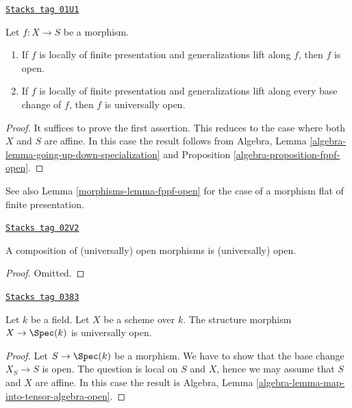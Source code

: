 \begin{lemma}
\label{morphisms-lemma-locally-finite-presentation-universally-open}
\href{https://stacks.math.columbia.edu/tag/01U1}{\texttt{Stacks tag 01U1}}

Let $f : X \to S$ be a morphism.
\begin{enumerate}
\item If $f$ is locally of finite presentation and generalizations lift
along $f$, then $f$ is open.
\item If $f$ is locally of finite presentation and generalizations lift
along every base change of $f$, then $f$ is universally open.
\end{enumerate}
\end{lemma}

\begin{proof}
It suffices to prove the first assertion.
This reduces to the case where both $X$ and $S$ are affine.
In this case the result follows from
Algebra, Lemma \ref{algebra-lemma-going-up-down-specialization}
and Proposition \ref{algebra-proposition-fppf-open}.
\end{proof}

See also Lemma \ref{morphisms-lemma-fppf-open} for the case of a morphism
flat of finite presentation.

\begin{lemma}
\label{morphisms-lemma-composition-open}
\href{https://stacks.math.columbia.edu/tag/02V2}{\texttt{Stacks tag 02V2}}

A composition of (universally) open morphisms is (universally) open.
\end{lemma}

\begin{proof}
Omitted.
\end{proof}

\begin{lemma}
\label{morphisms-lemma-scheme-over-field-universally-open}
\href{https://stacks.math.columbia.edu/tag/0383}{\texttt{Stacks tag 0383}}

Let $k$ be a field. Let $X$ be a scheme over $k$.
The structure morphism $X \to \Spec(k)$ is universally open.
\end{lemma}

\begin{proof}
Let $S \to \Spec(k)$ be a morphism.
We have to show that the base change $X_S \to S$ is open.
The question is local on $S$ and $X$, hence we may assume that
$S$ and $X$ are affine. In this case the result is
Algebra, Lemma \ref{algebra-lemma-map-into-tensor-algebra-open}.
\end{proof}


